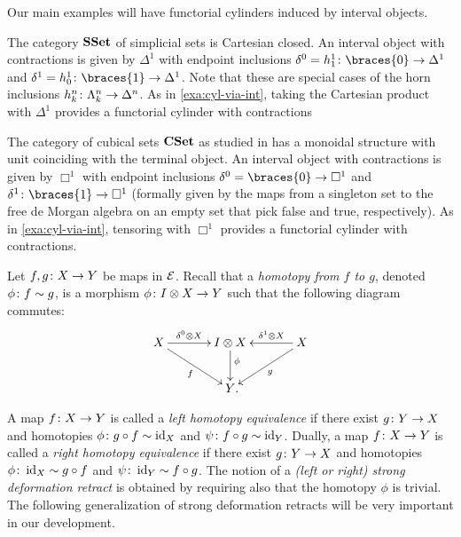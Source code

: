 \documentclass[reqno,10pt,a4paper,oneside,draft]{amsart}
\begin{document}
Our main examples will have functorial cylinders induced by interval objects.

\begin{example} \label{exa:cyl-in-sset}
The category $\mathbf{SSet}$ of simplicial sets is Cartesian closed.
An interval object with contractions is given by $\Delta^1$ with endpoint inclusions $\lcyl = h_1^1 \co \braces{0} \to \Delta^1$ and $\rcyl = h_0^1 \co \braces{1} \to \Delta^1$.
Note that these are special cases of the horn inclusions $h_k^n \colon \Lambda_k^n \to \Delta^n$.
As in \cref{exa:cyl-via-int}, taking the Cartesian product with $\Delta^1$ provides a functorial cylinder with contractions
\end{example}

\begin{example} \label{exa:cyl-in-cuset}
The category of cubical sets $\mathbf{CSet}$ as studied in \cite{coquand-variation} has a monoidal structure with unit coinciding with the terminal object.
An interval object with contractions is given by $\Box^1$ with endpoint inclusions $\lcyl = \braces{0} \to \Box^1$ and $\rcyl \co \braces{1} \to \Box^1$ (formally given by the maps from a singleton set to the free de Morgan algebra on an empty set that pick false and true, respectively).
As in \cref{exa:cyl-via-int}, tensoring with $\Box^1$ provides a functorial cylinder with contractions.
\end{example}

Let $f, g \colon X \to Y$ be maps in $\mathcal{E}$.
Recall that a \emph{homotopy from $f$ to $g$}, denoted $\phi \colon f \sim g$, is a morphism $\phi \colon I \otimes X \to Y$ such that the following diagram commutes:
\begin{equation}
\label{equ:homotopy}
\begin{gathered}
\xymatrix@C=1.2cm{
  X
  \ar[r]^-{\lcyl \otimes X}
  \ar[dr]_{f}
&
  \interval \otimes X
  \ar[d]^(0.4){\phi}
&
  X
  \ar[dl]^{g}
  \ar[l]_-{\rcyl \otimes X}
\\&
  Y
\rlap{.}}
\end{gathered}
\end{equation}

A map $f \colon X \to Y$ is called a \emph{left homotopy equivalence} if there exist $g \colon Y \to X$ and homotopies $\phi \colon g \mathbin{\circ} f \sim \operatorname{id}_X $ and $\psi \colon f \mathbin{\circ} g \sim \operatorname{id}_Y$.
Dually, a map $f \colon X \to Y$ is called a \emph{right homotopy equivalence} if there exist $g \colon Y \to X$ and homotopies $\phi \colon \operatorname{id}_X \sim g \mathbin{\circ} f$ and $\psi \colon \operatorname{id}_Y \sim f \mathbin{\circ} g$.
The notion of a \emph{(left or right) strong deformation retract} is obtained by requiring also that the homotopy $\phi$ is trivial.
The following generalization of strong deformation retracts will be very important in our development.
\end{document}
